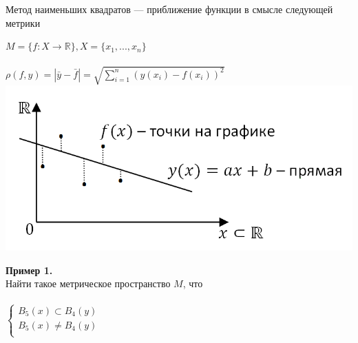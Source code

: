 \begin{notice}
    Метод наименьших квадратов --- приближение функции в смысле следующей метрики \begin{center} $M = \{f: X \rightarrow \mathbb{R} \}, X = \{ x_1, ..., x_n \}$\\ ~\\
        $\rho (f, y) = |\bar y - \bar f| = \sqrt{\sum\limits_{i=1}^n(y(x_i)-f(x_i))^2}$ \\
        \includegraphics[scale=0.6]{l4_4.png}\end{center}
\end{notice}
\noindent \textbf{Пример 1.}\\
Найти такое метрическое пространство $M$, что\\ \\
$  
\left\{  
\begin{array}{lcl}  
B_5(x) \subset B_4(y) \\  
B_5(x) \neq B_4(y)\\
\end{array}   
\right.  
$
